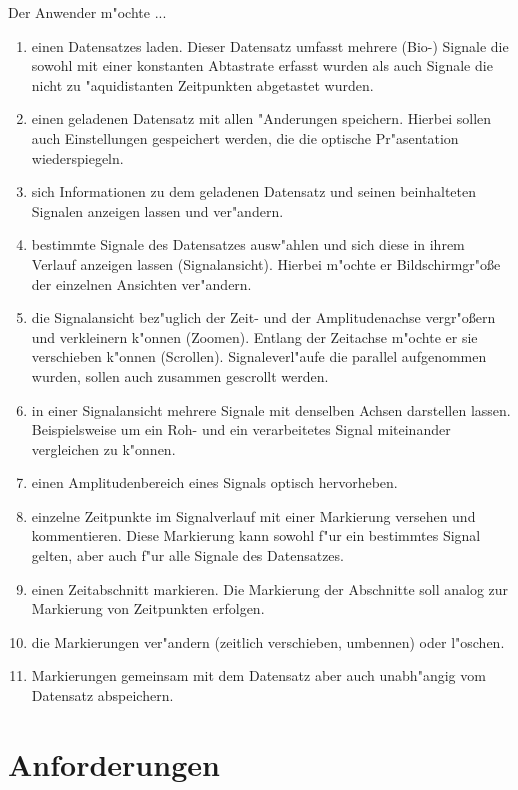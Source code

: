 \renewcommand{\theenumi}{\alph{enumi}}
\renewcommand{\labelenumi}{\theenumi )}
Der Anwender m"ochte ...
\begin{enumerate}
	\item einen Datensatzes laden.
		  Dieser Datensatz umfasst mehrere (Bio-) Signale die sowohl mit einer konstanten Abtastrate erfasst wurden als auch Signale die nicht zu "aquidistanten Zeitpunkten abgetastet wurden.
	\item einen geladenen Datensatz mit allen "Anderungen speichern.
		  Hierbei sollen auch Einstellungen gespeichert werden, die die optische Pr"asentation wiederspiegeln.
	\item sich Informationen zu dem geladenen Datensatz und seinen beinhalteten Signalen anzeigen lassen und ver"andern.
	\item bestimmte Signale des Datensatzes ausw"ahlen und sich diese in ihrem Verlauf anzeigen lassen (Signalansicht).
		  Hierbei m"ochte er Bildschirmgr"o\ss e der einzelnen Ansichten ver"andern.
	\item die Signalansicht bez"uglich der Zeit- und der Amplitudenachse vergr"o\ss ern und verkleinern k"onnen (Zoomen).
		  Entlang der Zeitachse m"ochte er sie verschieben k"onnen (Scrollen).
		  Signaleverl"aufe die parallel aufgenommen wurden, sollen auch zusammen gescrollt werden.
	\item in einer Signalansicht mehrere Signale mit denselben Achsen darstellen lassen.
		  Beispielsweise um ein Roh- und ein verarbeitetes Signal miteinander vergleichen zu k"onnen.
	\item einen Amplitudenbereich eines Signals optisch hervorheben.
	\item einzelne Zeitpunkte im Signalverlauf mit einer Markierung versehen und kommentieren.
		  Diese Markierung kann sowohl f"ur ein bestimmtes Signal gelten, aber auch f"ur alle Signale des Datensatzes.
	\item einen Zeitabschnitt markieren. Die Markierung der Abschnitte soll analog zur Markierung von Zeitpunkten erfolgen.
	\item die Markierungen ver"andern (zeitlich verschieben, umbennen) oder l"oschen.
	\item Markierungen gemeinsam mit dem Datensatz aber auch unabh"angig vom Datensatz abspeichern.
\end{enumerate}

\section{Anforderungen}

